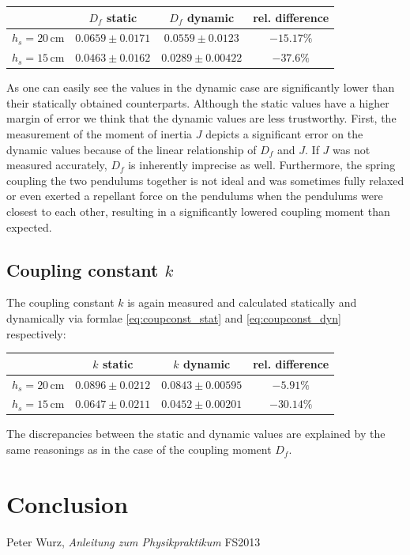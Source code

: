 \documentclass{scrreprt}
\newcommand{\unit}[1]{\ensuremath{\, \mathrm{#1}}}
\begin{document}
\begin{table}[H]
\center
\begin{tabular}{cccc}
 & $D_f$ static & $D_f$ dynamic & rel. difference\\
\hline
$h_s = 20 \unit{cm}$ & $0.0659 \pm 0.0171$ & $0.0559 \pm 0.0123$ & $-15.17\%$\\
$h_s = 15 \unit{cm}$ & $0.0463 \pm 0.0162$ & $0.0289 \pm 0.00422$ & $-37.6\%$\\
 
\end{tabular}
\end{table} 

As one can easily see the values in the dynamic case are significantly lower than their statically obtained counterparts. Although the static values have a higher margin of error we think that the dynamic values are less trustworthy. First, the measurement of the moment of inertia $J$ depicts a significant error on the dynamic values because of the linear relationship of $D_f$ and $J$. If $J$ was not measured accurately, $D_f$ is inherently imprecise as well. Furthermore, the spring coupling the two pendulums together is not ideal and was sometimes fully relaxed or even exerted a repellant force on the pendulums when the pendulums were closest to each other, resulting in a significantly lowered coupling moment than expected.

\subsection{Coupling constant $k$}
The coupling constant $k$ is again measured and calculated statically and dynamically via formlae \ref{eq:coupconst_stat} and \ref{eq:coupconst_dyn} respectively:

\begin{table}[H]
\center
\begin{tabular}{cccc}
 & $k$ static & $k$ dynamic & rel. difference\\
\hline
$h_s = 20 \unit{cm}$ & $0.0896 \pm 0.0212$ & $0.0843 \pm 0.00595$ & $-5.91\%$\\
$h_s = 15 \unit{cm}$ & $0.0647 \pm 0.0211$ & $0.0452 \pm 0.00201$ & $-30.14\%$\\
 
\end{tabular}
\end{table} 

The discrepancies between the static and dynamic values are explained by the same reasonings as in the case of the coupling moment $D_f$.


\section{Conclusion}

\begin{thebibliography}{9}

  Peter Wurz,
  \emph{Anleitung zum Physikpraktikum}
  FS2013

\end{thebibliography}
\end{document}
